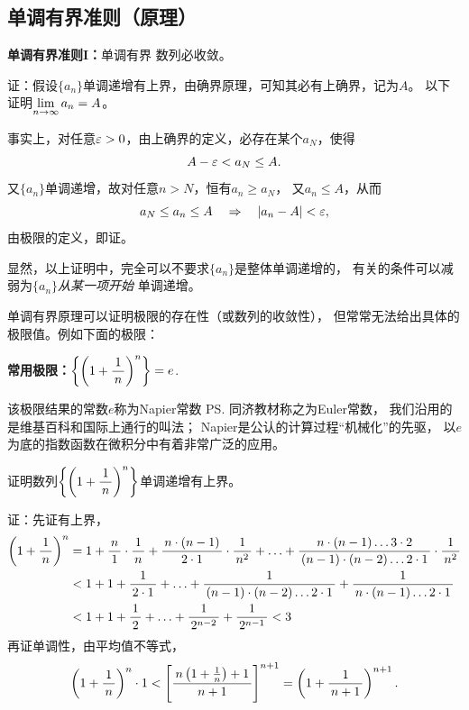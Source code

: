 \subsection{单调有界准则（原理）}

\begin{thx}
	{\bf 单调有界准则I：}单调有界
	数列必收敛。
\end{thx}

证：假设$\{a_n\}$单调递增有上界，由确界原理，可知其必有上确界，记为$A$。
以下证明$\lim\limits_{n\to\infty} a_n=A$。

事实上，对任意$\varepsilon>0$，由上确界的定义，必存在某个$a_N$，使得
$$A-\varepsilon<a_N\leq A.$$
又$\{a_n\}$单调递增，故对任意$n>N$，恒有$a_n\geq a_N$，
又$a_n\leq A$，从而
$$a_N\leq a_n\leq A\quad\Rightarrow\quad |a_n-A|<\varepsilon,$$
由极限的定义，即证。\fin

显然，以上证明中，完全可以不要求$\{a_n\}$是整体单调递增的，
有关的条件可以减弱为$\{a_n\}${\it 从某一项开始}
单调递增。

单调有界原理可以证明极限的存在性（或数列的收敛性），
但常常无法给出具体的极限值。例如下面的极限：

\begin{thx}
	{\bf 常用极限：}$\left\{\left(1+\displaystyle\frac{\,{1}\,}{\,{n}\,}\right)^n\right\}=e$.
\end{thx}

该极限结果的常数$e$称为{\kaishu Napier常数}
\ps{同济教材称之为Euler常数，
我们沿用的是维基百科和国际上通行的叫法；
Napier是公认的计算过程“机械化”的先驱}，
以$e$为底的指数函数在微积分中有着非常广泛的应用。

\begin{shaded}
\egz 证明数列$\left\{\left(1+\displaystyle\frac{\,{1}\,}{\,{n}\,}\right)^n\right\}$单调递增有上界。

证：先证有上界，
\begin{align}
	\left(1+\displaystyle\frac{\,{1}\,}{\,{n}\,}\right)^n&=1+\displaystyle\frac{\,{n}\,}{\,{1}\,}\cdot\displaystyle\frac{\,{1}\,}{\,{n}\,}
	+\displaystyle\frac{\,{n\cdot(n-1)}\,}{\,{2\cdot1}\,}\cdot\displaystyle\frac{\,{1}\,}{\,{n^2}\,}+\ldots
	+\displaystyle\frac{\,{n\cdot(n-1)\ldots3\cdot2}\,}{\,{(n-1)\cdot(n-2)\ldots2\cdot1}\,}\cdot\displaystyle\frac{\,{1}\,}{\,{n^2}\,}\notag\\
	&<1+1+\displaystyle\frac{\,{1}\,}{\,{2\cdot1}\,}+\ldots+\displaystyle\frac{\,{1}\,}{\,{(n-1)\cdot(n-2)\ldots2\cdot1}\,}
	+\displaystyle\frac{\,{1}\,}{\,{n\cdot(n-1)\ldots2\cdot1}\,}\notag\\
	&<1+1+\displaystyle\frac{\,{1}\,}{\,{2}\,}+\ldots+\displaystyle\frac{\,{1}\,}{\,{2^{n-2}}\,}+\displaystyle\frac{\,{1}\,}{\,{2^{n-1}}\,}<3\notag
\end{align}
再证单调性，由平均值不等式，
$$\left(1+\displaystyle\frac{\,{1}\,}{\,{n}\,}\right)^n\cdot 1<
\left[\displaystyle\frac{\,{n\left(1+\frac1n\right)+1}\,}{\,{n+1}\,}\right]^{n+1}
=\left(1+\displaystyle\frac{\,{1}\,}{\,{n+1}\,}\right)^{n+1}.$$
\fin
\end{shaded}

